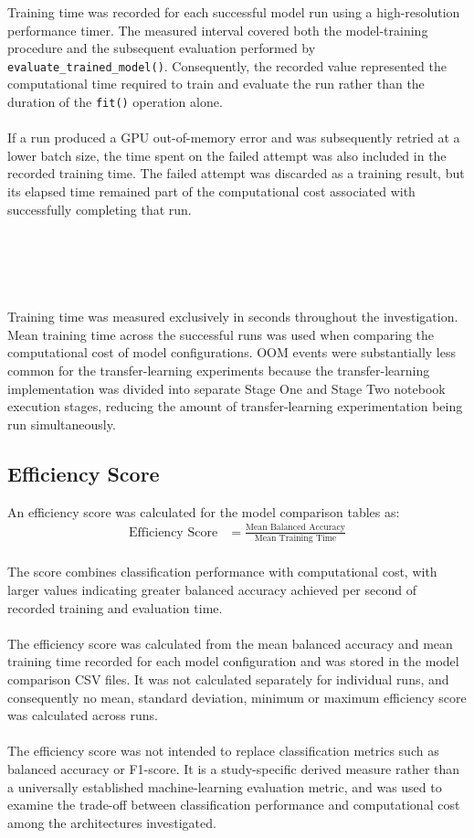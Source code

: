 \documentclass[12pt, a4paper]{report}
\let\oldsubsection\subsection
\renewcommand{\subsection}{%
    \Needspace{6\baselineskip}%
    \oldsubsection
}
\begin{document}
				Training time was recorded for each successful model run using a high-resolution performance timer. The measured interval covered both the model-training procedure and the subsequent evaluation performed by \texttt{evaluate\_trained\_model()}. Consequently, the recorded value represented the computational time required to train and evaluate the run rather than the duration of the \texttt{fit()} operation alone.\\\\
				If a run produced a GPU out-of-memory error and was subsequently retried at a lower batch size, the time spent on the failed attempt was also included in the recorded training time. The failed attempt was discarded as a training result, but its elapsed time remained part of the computational cost associated with successfully completing that run.\\\\\\\\\\\\
				Training time was measured exclusively in seconds throughout the investigation. Mean training time across the successful runs was used when comparing the computational cost of model configurations. OOM events were substantially less common for the transfer-learning experiments because the transfer-learning implementation was divided into separate Stage One and Stage Two notebook execution stages, reducing the amount of transfer-learning experimentation being run simultaneously.
				
			\subsection{Efficiency Score}
				
				An efficiency score was calculated for the model comparison tables as:\\
				\begin{align*}
					\text{Efficiency Score}&=\frac{\text{Mean Balanced Accuracy}}{\text{Mean Training Time}}
				\end{align*}\\
				The score combines classification performance with computational cost, with larger values indicating greater balanced accuracy achieved per second of recorded training and evaluation time.\\\\
				The efficiency score was calculated from the mean balanced accuracy and mean training time recorded for each model configuration and was stored in the model comparison CSV files. It was not calculated separately for individual runs, and consequently no mean, standard deviation, minimum or maximum efficiency score was calculated across runs.\\\\
				The efficiency score was not intended to replace classification metrics such as balanced accuracy or F1-score. It is a study-specific derived measure rather than a universally established machine-learning evaluation metric, and was used to examine the trade-off between classification performance and computational cost among the architectures investigated.
				
\end{document}
